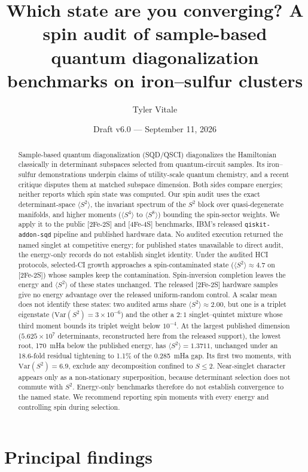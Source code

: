 \documentclass[11pt]{article}
\title{\textbf{Which state are you converging? A spin audit of sample-based quantum diagonalization benchmarks on iron--sulfur clusters}}
\author{Tyler Vitale}
\affil{Pure State Labs Inc.\ --- \href{https://purestatelabs.com}{purestatelabs.com}\\
research@purestatelabs.com \,$\cdot$\, ORCID: \href{https://orcid.org/0009-0003-6156-0212}{0009-0003-6156-0212}}
\date{Draft v6.0 --- September 11, 2026}
\newcommand{\ssq}{\ensuremath{\langle S^2\rangle}}
\begin{document}
\maketitle

\begin{abstract}
Sample-based quantum diagonalization (SQD/QSCI) diagonalizes the Hamiltonian classically in determinant subspaces selected from quantum-circuit samples. Its iron--sulfur demonstrations underpin claims of utility-scale quantum chemistry, and a recent critique disputes them at matched subspace dimension. Both sides compare energies; neither reports which spin state was computed. Our spin audit uses the exact determinant-space \ssq{}, the invariant spectrum of the $S^2$ block over quasi-degenerate manifolds, and higher moments ($\langle S^4\rangle$ to $\langle S^8\rangle$) bounding the spin-sector weights. We apply it to the public [2Fe-2S] and [4Fe-4S] benchmarks, IBM's released \texttt{qiskit-addon-sqd} pipeline and published hardware data. No audited execution returned the named singlet at competitive energy; for published states unavailable to direct audit, the energy-only records do not establish singlet identity. Under the audited HCI protocols, selected-CI growth approaches a spin-contaminated state ($\ssq \approx 4.7$ on [2Fe-2S]) whose samples keep the contamination. Spin-inversion completion leaves the energy and \ssq{} of these states unchanged. The released [2Fe-2S] hardware samples give no energy advantage over the released uniform-random control. A scalar mean does not identify these states: two audited arms share $\ssq \approx 2.00$, but one is a triplet eigenstate ($\mathrm{Var}(S^2) = 3\times10^{-6}$) and the other a $2{:}1$ singlet--quintet mixture whose third moment bounds its triplet weight below $10^{-4}$. At the largest published dimension ($5.625\times10^7$ determinants, reconstructed here from the released support), the lowest root, 170~mHa below the published energy, has $\ssq = 1.3711$, unchanged under an 18.6-fold residual tightening to 1.1\% of the 0.285~mHa gap. Its first two moments, with $\mathrm{Var}(S^2) = 6.9$, exclude any decomposition confined to $S \le 2$. Near-singlet character appears only as a non-stationary superposition, because determinant selection does not commute with $S^2$. Energy-only benchmarks therefore do not establish convergence to the named state. We recommend reporting spin moments with every energy and controlling spin during selection.
\end{abstract}

\section*{Principal findings}
\end{document}
